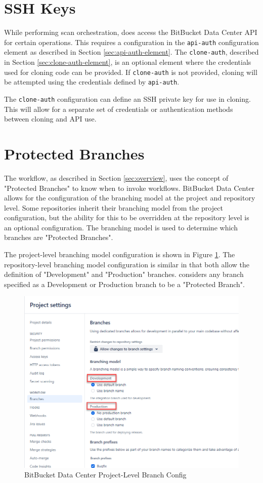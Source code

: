 \section{\cxoneflow SSH Keys}

While performing scan orchestration, \cxoneflow does access the BitBucket Data Center API for
certain operations.  This requires a configuration in the \texttt{api-auth} configuration
element as described in Section \ref{sec:api-auth-element}.  The \texttt{clone-auth},
described in Section \ref{sec:clone-auth-element}, is an optional element where the credentials
used for cloning code can be provided.  If \texttt{clone-auth} is not provided, cloning will
be attempted using the credentials defined by \texttt{api-auth}.

The \texttt{clone-auth} configuration can define an SSH private key for use in cloning.  This
will allow for a separate set of credentials or authentication methods between cloning and
API use.


\section{Protected Branches}

The \cxoneflow workflow, as described in Section \ref{sec:overview}, uses the concept of "Protected Branches"
to know when to invoke workflows.  BitBucket Data Center allows for the configuration of the branching model
at the project and repository level.  Some repositories inherit their branching model from the project
configuration, but the ability for this to be overridden at the repository level is an optional configuration.
The branching model is used to determine which branches are "Protected Branches".

The project-level branching model configuration is shown in Figure \ref{fig:bbdc-branch-config}.  The
repository-level branching model configuration is similar in that both allow the definition of
"Development" and "Production" branches.  \cxoneflow considers any branch specified as a Development
or Production branch to be a "Protected Branch".

\begin{figure}[ht]
    \includegraphics[width=\textwidth]{graphics/bbdc-branch-config.png}
    \caption{BitBucket Data Center Project-Level Branch Config}
    \label{fig:bbdc-branch-config}
\end{figure}

